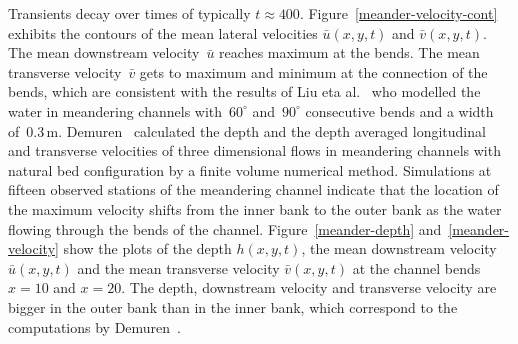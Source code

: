 \documentclass[a5paper,12pt]{article}
\newcommand{\uu}{{\bar u}}
\newcommand{\vv}{{\bar v}}
\begin{document}
Transients decay over times of typically \(t\approx400\).
Figure~\ref{meander-velocity-cont} exhibits the contours of the mean lateral velocities $\uu(x,y,t)$ and $\vv(x,y,t)$. 
The mean downstream velocity~$\uu$ reaches maximum at the bends.
The mean transverse velocity~$\vv$ gets to maximum and minimum at the connection of the bends, which are consistent with the results of Liu eta al.~\cite{Liu2009} who modelled the water in meandering channels with~$60^\circ$ and~$90^\circ$ consecutive bends and a width of~$0.3$\,m.
Demuren~\cite{Demuren1993} calculated the depth and the depth averaged longitudinal and transverse velocities of three dimensional flows in meandering channels with natural bed configuration by a finite volume numerical method. 
Simulations at fifteen observed stations of the meandering channel indicate that the location of the maximum velocity shifts from the inner bank to the outer bank as the water flowing through the bends of the channel. 
Figure~\ref{meander-depth} and~\ref{meander-velocity} show the plots of the depth $h(x,y,t)$, the mean downstream velocity $\uu(x,y,t)$ and the mean transverse velocity $\vv(x,y,t)$ at the channel bends $x=10$ and $x=20$.
The depth, downstream velocity and transverse velocity are bigger in the outer bank than in the inner bank, which correspond to the computations by Demuren~\cite{Demuren1993}. 
\end{document}
